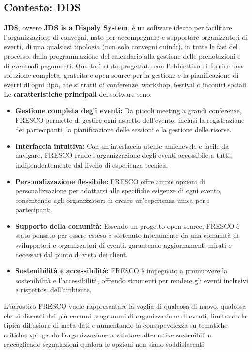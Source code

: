 \documentclass[a4paper,11pt]{article}
\begin{document}
	\subsection{Contesto: DDS} \label{fresco}
	\textbf{JDS}, ovvero \textbf{JDS is a Dispaly System}, è un software ideato per facilitare l'organizzazione di convegni, nato per accompagnare e supportare organizzatori di eventi, di una qualsiasi tipologia (non solo convegni quindi), in tutte le fasi del processo, dalla programmazione del calendario alla gestione delle prenotazioni e di eventuali pagamenti. Questo è stato progettato con l'obbiettivo di fornire una soluzione completa, gratuita e open source per la gestione e la pianificazione di eventi di ogni tipo, che si tratti di conferenze, workshop, festival o incontri sociali.\\
	Le \textbf{caratteristiche principali} del software sono:
	\begin{itemize}\setlength\itemsep{-3pt}
		\item \textbf{Gestione completa degli eventi:} Da piccoli meeting a grandi conferenze, FRESCO permette di gestire ogni aspetto dell’evento, inclusi la registrazione dei partecipanti, la pianificazione delle sessioni e la gestione delle risorse.
		\item \textbf{Interfaccia intuitiva:} Con un’interfaccia utente amichevole e facile da navigare, FRESCO rende l’organizzazione degli eventi accessibile a tutti, indipendentemente dal livello di esperienza tecnica.
		\item \textbf{Personalizzazione flessibile:} FRESCO offre ampie opzioni di personalizzazione per adattarsi alle specifiche esigenze di ogni evento, consentendo agli organizzatori di creare un’esperienza unica per i partecipanti.
		\item \textbf{Supporto della comunità:} Essendo un progetto open source, FRESCO è stato pensato per essere esteso e sostenuto interamente da una comunità di sviluppatori e organizzatori di eventi, garantendo aggiornamenti mirati e necessari dal punto di vista dei client.
		\item \textbf{Sostenibilità e accessibilità:} FRESCO è impegnato a promuovere la sostenibilità e l’accessibilità, offrendo strumenti per rendere gli eventi inclusivi e rispettosi dell’ambiente.
	\end{itemize}
	L'acrostico FRESCO vuole rappresentare la voglia di qualcosa di nuovo, qualcosa che si discosti dai più comuni programmi di organizzazione di eventi, limitando la tipica diffusione di meta-dati e aumentando la consapevolezza su tematiche critiche, spingendo l'organizzazione a valutare alternative sostenibili o raccogliendo segnalazioni qualora le opzioni non siano soddisfacenti.
	
\end{document}
